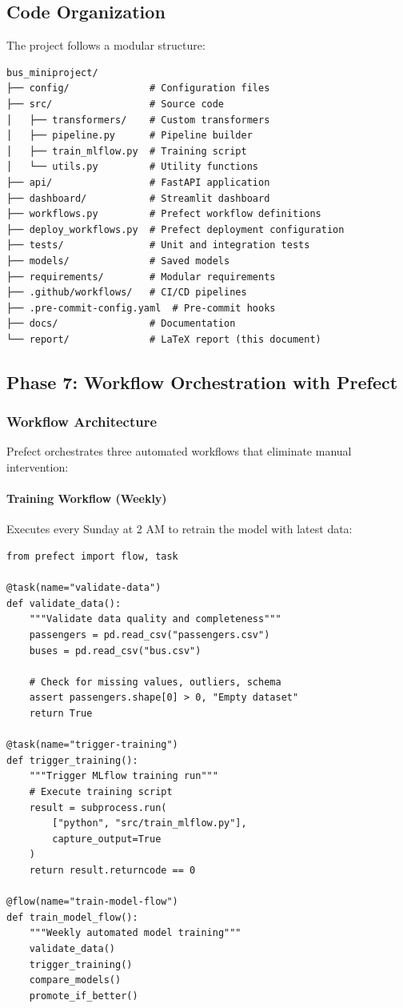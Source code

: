 \subsection{Code Organization}

The project follows a modular structure:

\begin{verbatim}
bus_miniproject/
├── config/              # Configuration files
├── src/                 # Source code
│   ├── transformers/    # Custom transformers
│   ├── pipeline.py      # Pipeline builder
│   ├── train_mlflow.py  # Training script
│   └── utils.py         # Utility functions
├── api/                 # FastAPI application
├── dashboard/           # Streamlit dashboard
├── workflows.py         # Prefect workflow definitions
├── deploy_workflows.py  # Prefect deployment configuration
├── tests/               # Unit and integration tests
├── models/              # Saved models
├── requirements/        # Modular requirements
├── .github/workflows/   # CI/CD pipelines
├── .pre-commit-config.yaml  # Pre-commit hooks
├── docs/                # Documentation
└── report/              # LaTeX report (this document)
\end{verbatim}

\subsection{Phase 7: Workflow Orchestration with Prefect}

\subsubsection{Workflow Architecture}

Prefect orchestrates three automated workflows that eliminate manual intervention:

\paragraph{Training Workflow (Weekly)}
Executes every Sunday at 2 AM to retrain the model with latest data:

\begin{lstlisting}[style=python, caption=Training Workflow]
from prefect import flow, task

@task(name="validate-data")
def validate_data():
    """Validate data quality and completeness"""
    passengers = pd.read_csv("passengers.csv")
    buses = pd.read_csv("bus.csv")
    
    # Check for missing values, outliers, schema
    assert passengers.shape[0] > 0, "Empty dataset"
    return True

@task(name="trigger-training")
def trigger_training():
    """Trigger MLflow training run"""
    # Execute training script
    result = subprocess.run(
        ["python", "src/train_mlflow.py"],
        capture_output=True
    )
    return result.returncode == 0

@flow(name="train-model-flow")
def train_model_flow():
    """Weekly automated model training"""
    validate_data()
    trigger_training()
    compare_models()
    promote_if_better()
\end{lstlisting}


